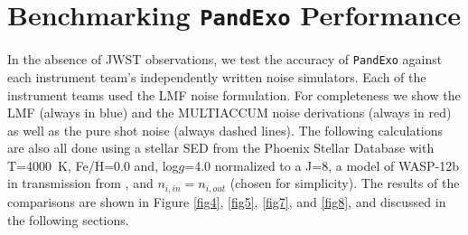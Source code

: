 \documentclass[iop]{emulateapj}
\begin{document}
\section{Benchmarking \texttt{P\MakeLowercase{and}E\MakeLowercase{xo}} Performance}
In the absence of JWST observations, we test the accuracy of \texttt{PandExo} against each instrument team's independently written noise simulators. Each of the instrument teams used the LMF noise formulation. For completeness we show the LMF (always in blue) and the MULTIACCUM noise derivations (always in red) as well as the pure shot noise (always dashed lines). The following calculations are also all done using a stellar SED from the Phoenix Stellar Database \citep{huss13} with T=4000~K, Fe/H=0.0 and, log$g$=4.0 normalized to a J=8, a model of WASP-12b in transmission from \citet{mad14}, and $n_{i,in}=n_{i,out}$ (chosen for simplicity). The results of the comparisons are shown in Figure \ref{fig4}, \ref{fig5}, \ref{fig7}, and \ref{fig8}, and discussed in the following sections. 
\end{document}
